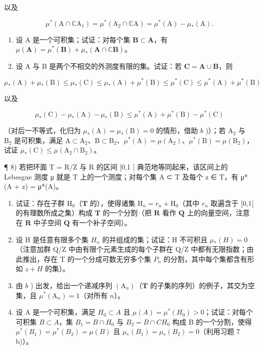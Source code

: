 以及

\[
\mu^ {*} (\mathrm{A} \cap \mathbb {C} \mathrm{A} _ {1}) = \mu^ {*} (\mathrm{A} _ {2} \cap \mathbb {C} \mathrm{A}) = \mu^ {*} (\mathrm{A}) - \mu_ {*} (\mathrm{A}).
\]

\begin{enumerate}
\def\labelenumi{\alph{enumi})}
\setcounter{enumi}{2}
\item
  设 A 是一个可积集；试证：对每个集 \(\mathbf{B} \subset \mathbf{A}\)，有 \(\mu(\mathbf{A}) = \mu^{*}(\mathbf{B}) + \mu_{*}(\mathbf{A} \cap \mathbb{C}\mathbf{B})\)。
\item
  设 A 与 B 是两个不相交的外测度有限的集。试证：若 \(\mathbf{C} = \mathbf{A} \cup \mathbf{B}\)，则
\end{enumerate}

\[
\mu_ {*} (\mathrm{A}) + \mu_ {*} (\mathrm{B}) \leqslant \mu_ {*} (\mathrm{C}) \leqslant \mu_ {*} (\mathrm{A}) + \mu^ {*} (\mathrm{B}) \leqslant \mu^ {*} (\mathrm{C}) \leqslant \mu^ {*} (\mathrm{A}) + \mu^ {*} (\mathrm{B})
\]

以及

\[
\mu_ {*} (\mathrm{C}) - \mu_ {*} (\mathrm{A}) - \mu_ {*} (\mathrm{B}) \leqslant \mu^ {*} (\mathrm{A}) + \mu^ {*} (\mathrm{B}) - \mu^ {*} (\mathrm{C})
\]

（对后一不等式，化归为 \(\mu_{*}(\mathrm{A}) = \mu_{*}(\mathrm{B}) = 0\) 的情形，借助 \(b\) )）；若 \(\mathrm{A}_2\) 与 \(\mathrm{B}_2\) 是可积集，满足 \(\mathrm{A} \subset \mathrm{A}_2\)、\(\mathrm{B} \subset \mathrm{B}_2\)、\(\mu^{*}(\mathrm{A}) = \mu(\mathrm{A}_2)\)、\(\mu^{*}(\mathrm{B}) = \mu(\mathrm{B}_2)\)，试证 \(\mu_{*}(\mathrm{C}) \leqslant \mu(\mathrm{A}_2 \cap \mathrm{B}_2)\)。

¶ 8) 若把环面 T = R/Z 与 R 的区间 {[}0,1 {[} 典范地等同起来，该区间上的 Lebesgue 测度 μ 就是 T 上的一个测度；对每个集 A ⊂ T 及每个 z ∈ T，有 μ*(A + z) = μ*(A)。

\begin{enumerate}
\def\labelenumi{\alph{enumi})}
\item
  试证：存在子群 \(\mathrm{H}_0\)（\(\mathbf{T}\) 的），使得诸集 \(\mathrm{H}_n = r_n + \mathrm{H}_0\)（其中 \(r_n\) 取遍含于 {[}0,1{[} 的有理数所成之集）构成 \(\mathbf{T}\) 的一个分割（把 \(\mathbf{R}\) 看作 \(\mathbf{Q}\) 上的向量空间，注意在 \(\mathbf{R}\) 中子空间 \(\mathbf{Q}\) 有一个补子空间）。
\item
  设 H 是任意有限多个集 \(H_{n}\) 的并组成的集；试证：H 不可积且 \(\mu_{*}(H)=0\)（注意加群 Q/Z 中由有限个元素生成的每个子群在 Q/Z 中都有无限指数；由此推出，存在 T 的一个分成可数无穷多个集 \(P_{n}\) 的分割，其中每个集都含有形如 \(z+H\) 的集）。
\item
  由 \(b\) ) 出发，给出一个递减序列 \((\mathrm{A}_n)\)（\(\mathbf{T}\) 的子集的序列）的例子，其交为空集，且 \(\mu^{*}(\mathrm{A}_{n}) = 1\)（对所有 \(n\)）。
\item
  设 A 是一个可积集，满足 \(H_{0} \subset A\) 且 \(\mu(A) = \mu^{*}(H_{0}) > 0\)；试证：对每个可积集 \(B \subset A\)，集 \(B_{1} = B \cap H_{0}\) 与 \(B_{2} = B \cap C H_{0}\) 构成 B 的一个分割，使得 \(\mu^{*}(B_{1}) = \mu^{*}(B_{2}) = \mu(B)\) 且 \(\mu_{*}(B_{1}) = \mu_{*}(B_{2}) = 0\)（利用习题 7 b)）。
\end{enumerate}

